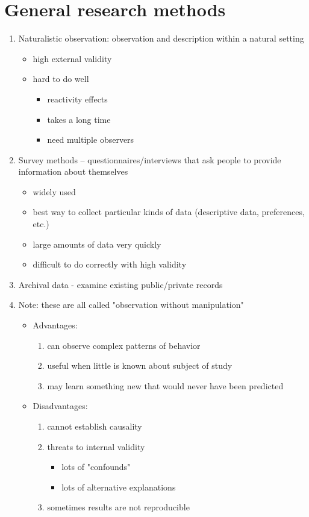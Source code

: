 \documentclass[11pt]{article}
\begin{document}
\section*{General research methods}
\label{sec-3}
\begin{enumerate}
\item Naturalistic observation: observation and description within a natural setting
\begin{itemize}
\item high external validity
\item hard to do well
\begin{itemize}
\item reactivity effects
\item takes a long time
\item need multiple observers
\end{itemize}
\end{itemize}
\item Survey methods -- questionnaires/interviews that ask people to provide information about themselves
\begin{itemize}
\item widely used
\item best way to collect particular kinds of data (descriptive data, preferences, etc.)
\item large amounts of data very quickly
\item difficult to do correctly with high validity
\end{itemize}
\item Archival data - examine existing public/private records

\item Note: these are all called "observation without manipulation"
\begin{itemize}
\item Advantages:
\begin{enumerate}
\item can observe complex patterns of behavior
\item useful when little is known about subject of study
\item may learn something new that would never have been predicted
\end{enumerate}
\item Disadvantages:
\begin{enumerate}
\item cannot establish causality
\item threats to internal validity
\begin{itemize}
\item lots of "confounds"
\item lots of alternative explanations
\end{itemize}
\item sometimes results are not reproducible
\end{enumerate}
\end{itemize}


\end{enumerate}
\end{document}
